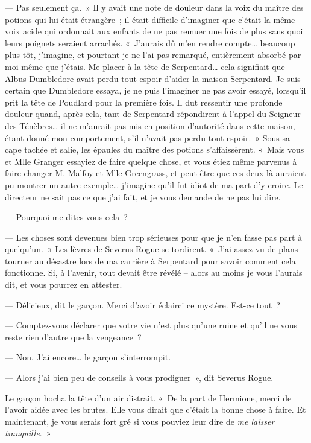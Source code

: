--- Pas seulement ça.~»
Il y avait une note de douleur dans la voix du maître des potions qui lui était étrangère~; il était difficile d'imaginer que c'était la même voix acide qui ordonnait aux enfants de ne pas remuer une fois de plus sans quoi leurs poignets seraient arrachés.
«~J'aurais dû m'en rendre compte… beaucoup plus tôt, j'imagine, et pourtant je ne l'ai pas remarqué, entièrement absorbé par moi-même que j'étais.
Me placer à la tête de Serpentard… cela signifiait que Albus Dumbledore avait perdu tout espoir d'aider la maison Serpentard.
Je suis certain que Dumbledore essaya, je ne puis l'imaginer ne pas avoir essayé, lorsqu'il prit la tête de Poudlard pour la première fois.
Il dut ressentir une profonde douleur quand, après cela, tant de Serpentard répondirent à l'appel du Seigneur des Ténèbres… il ne m'aurait pas mis en position d'autorité dans cette maison, étant donné mon comportement, s'il n'avait pas perdu tout espoir.~»
Sous sa cape tachée et salie, les épaules du maître des potions s'affaissèrent.
«~Mais vous et Mlle Granger essayiez de faire quelque chose, et vous étiez même parvenus à faire changer M. Malfoy et Mlle Greengrass, et peut-être que ces deux-là auraient pu montrer un autre exemple… j'imagine qu'il fut idiot de ma part d'y croire.
Le directeur ne sait pas ce que j'ai fait, et je vous demande de ne pas lui dire.

--- Pourquoi me dites-vous cela~?

--- Les choses sont devenues bien trop sérieuses pour que je n'en fasse pas part à quelqu'un.~»
Les lèvres de Severus Rogue se tordirent.
«~J'ai assez vu de plans tourner au désastre lors de ma carrière à Serpentard pour savoir comment cela fonctionne.
Si, à l'avenir, tout devait être révélé -- alors au moins je vous l'aurais dit, et vous pourrez en attester.

--- Délicieux, dit le garçon.
Merci d'avoir éclairci ce mystère.
Est-ce tout~?

--- Comptez-vous déclarer que votre vie n'est plus qu'une ruine et qu'il ne vous reste rien d'autre que la vengeance~?

--- Non.
J'ai encore… le garçon s'interrompit.

--- Alors j'ai bien peu de conseils à vous prodiguer~», dit Severus Rogue.

Le garçon hocha la tête d'un air distrait.
«~De la part de Hermione, merci de l'avoir aidée avec les brutes.
Elle vous dirait que c'était la bonne chose à faire.
Et maintenant, je vous serais fort gré si vous pouviez leur dire de \emph{me laisser tranquille}.~»

